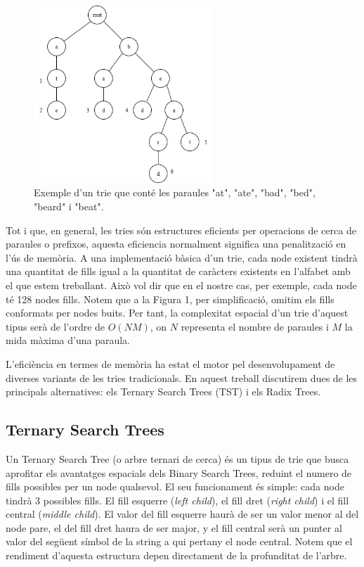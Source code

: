 \begin{figure}[H]
    \centering
    \includegraphics[width=0.6\textwidth]{figures/trie_example.png}
    \caption{Exemple d'un trie que conté les paraules "at", "ate", "bad", "bed", "beard" i "beat".}
    \label{fig:trie_example}
\end{figure}
Tot i que, en general, les tries són estructures eficients per operacions de cerca de paraules o prefixos, aquesta eficiencia normalment significa una penalització en l'ús de memòria. A una implementació bàsica d'un trie, cada node existent tindrà una quantitat de fills igual a la quantitat de caràcters existents en l'alfabet amb el que estem treballant. Això vol dir que en el nostre cas, per exemple, cada node té 128 nodes fills. Notem que a la Figura 1, per simplificació, omitim els fills conformats per nodes buits. 
Per tant, la complexitat espacial d'un trie d'aquest tipus serà de l'ordre de $ O(NM) $, on $N$ representa el nombre de paraules i $M$ la mida màxima d'una paraula. 
 
L'eficiència en termes de memòria ha estat el motor pel desenvolupament de diverses variants de les tries tradicionals. En aquest treball discutirem dues de les principals alternatives: els Ternary Search Trees (TST) i els Radix Trees. 
\subsection{Ternary Search Trees}
Un Ternary Search Tree (o arbre ternari de cerca) és un tipus de trie que busca aprofitar els avantatges espacials dels Binary Search Trees, reduint el numero de fills possibles per un node qualsevol. 
El seu funcionament és simple: cada node tindrà 3 possibles fills. El fill esquerre (\textit{left child}), el fill dret (\textit{right child}) i el fill central (\textit{middle child}). El valor del fill esquerre haurà de ser un valor menor al del node pare, el del fill dret haura de ser major, y el fill central serà un punter al valor del següent símbol de la string a qui pertany el node central.
Notem que el rendiment d'aquesta estructura depen directament de la profunditat de l'arbre.  


